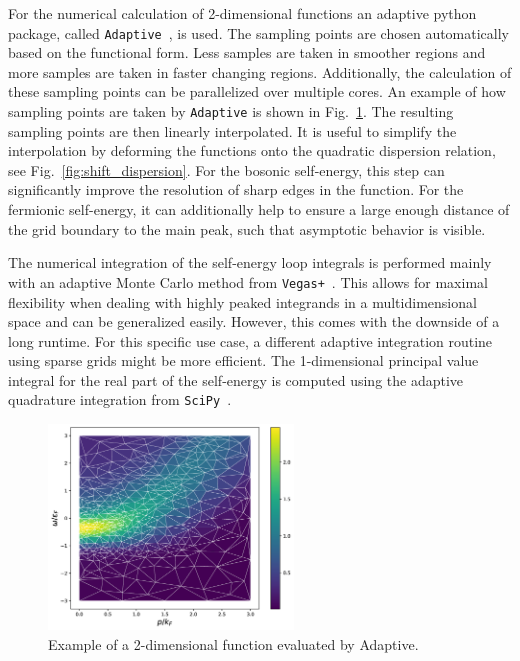 For the numerical calculation of 2-dimensional functions an adaptive python package, called \verb|Adaptive|~\cite{Nijholt2019}, is used. The sampling points are chosen automatically based on the functional form. Less samples are taken in smoother regions and more samples are taken in faster changing regions. Additionally, the calculation of these sampling points can be parallelized over multiple cores. An example of how sampling points are taken by \verb|Adaptive| is shown in Fig.~\ref{fig:adaptive}. The resulting sampling points are then linearly interpolated. It is useful to simplify the interpolation by deforming the functions onto the quadratic dispersion relation, see Fig.~\ref{fig:shift_dispersion}. For the bosonic self-energy, this step can significantly improve the resolution of sharp edges in the function. For the fermionic self-energy, it can additionally help to ensure a large enough distance of the grid boundary to the main peak, such that asymptotic behavior is visible. 

The numerical integration of the self-energy loop integrals is performed mainly with an adaptive Monte Carlo method from \verb|Vegas+|~\cite{Lepage2021}. This allows for maximal flexibility when dealing with highly peaked integrands in a multidimensional space and can be generalized easily. However, this comes with the downside of a long runtime. For this specific use case, a different adaptive integration routine using sparse grids might be more efficient. The 1-dimensional principal value integral for the real part of the self-energy is computed using the adaptive quadrature integration from \verb|SciPy|~\cite{Virtanen2019}.

\begin{figure}[h]
	\centering
	\includegraphics[width=0.58\textwidth]{figs/adaptive.png}
	\caption[Evaluation of a function with Adaptive]{Example of a 2-dimensional function evaluated by Adaptive.}
	\label{fig:adaptive}
\end{figure}

